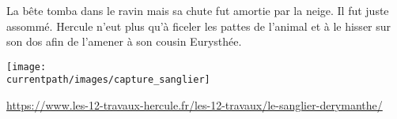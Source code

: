 \begin{changemargin}{-15mm}{-15mm}
\begin{activite}
\begin{minipage}{14cm}
                \begin{minipage}{8cm}
                La bête tomba dans le ravin mais sa chute fut amortie par la neige. Il fut juste assommé. Hercule n’eut plus qu’à ficeler les pattes de l’animal et à le hisser sur son dos afin de l’amener à son cousin Eurysthée.
                \end{minipage}
                \qquad
                \begin{minipage}{5cm}
                \texttt{[image: \\currentpath/images/capture\_sanglier]} \\ [2mm]
                \end{minipage}
            \end{minipage}

            \hfill{\footnotesize \href{https://www.les-12-travaux-hercule.fr/les-12-travaux/le-sanglier-derymanthe/}{https://www.les-12-travaux-hercule.fr/les-12-travaux/le-sanglier-derymanthe/}}
       \clearpage       
\end{activite}
\end{changemargin}
